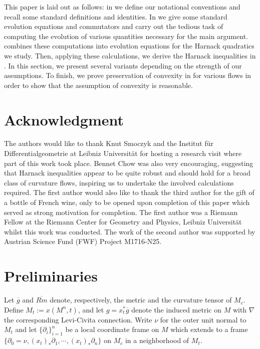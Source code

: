 \documentclass{amsart}
\begin{document}
This paper is laid out as follows: in  we define our notational conventions and recall some standard definitions and identities. In  we give some standard evolution equations and commutators and carry out the tedious task of computing the evolution of various quantities necessary for the main argument.  combines these computations into evolution equations for the Harnack quadratics we study. Then, applying these calculations, we derive the Harnack inequalities in . In this section, we present several variants depending on the strength of our assumptions. To finish, we prove preservation of convexity in  for various flows in order to show that the assumption of convexity is reasonable.

\section*{Acknowledgment}

The authors would like to thank Knut Smoczyk and the Institut f\"{u}r Differentialgeometrie at Leibniz Universität for hosting a research visit where part of this work took place. Bennet Chow was also very encouraging, suggesting that Harnack inequalities appear to be quite robust and should hold for a broad class of curvature flows, inspiring us to undertake the involved calculations required. The first author would also like to thank the third author for the gift of a bottle of French wine, only to be opened upon completion of this paper which served as strong motivation for completion. The first author was a Riemann Fellow at the Riemann Center for Geometry and Physics, Leibniz Universit\"{a}t whilst this work was conducted. The work of the second author was supported by Austrian Science Fund (FWF) Project M1716-N25.

\section{Preliminaries}
\label{sec:prelim}

Let $\overline{g}$ and $\overline{Rm}$ denote, respectively, the metric and the curvature tensor of $M_c$. Define \(M_t := x(M^n,t)\), and let \(g = x_t^{\ast} \overline{g}\) denote the induced metric on \(M\) with $\nabla$ the corresponding Levi-Civita connection. Write $\nu$ for the outer unit normal to $M_t$ and let \(\{\partial_i\}_{i=1}^n\) be a local coordinate frame on \(M\) which extends to a frame \(\{\partial_0 = \nu, (x_t)_{\ast} \partial_1, \cdots, (x_t)_{\ast} \partial_n\}\) on \(M_c\) in a neighborhood of \(M_t\).
\end{document}
